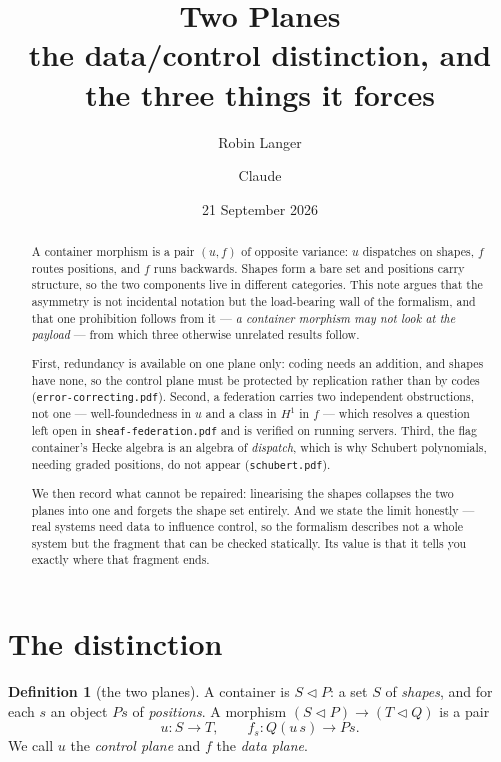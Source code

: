 \documentclass[11pt,a4paper]{article}
\title{\bfseries Two Planes\\[0.4em]
\large the data/control distinction, and the three things it forces}
\author{Robin Langer \and Claude}
\date{21 September 2026}
\theoremstyle{definition}
\newtheorem{definition}[theorem]{Definition}
\theoremstyle{remark}
\newcommand{\con}{\triangleleft}
\begin{document}
\maketitle

\begin{abstract}
A container morphism is a pair $(u, f)$ of opposite variance: $u$ dispatches on
shapes, $f$ routes positions, and $f$ runs backwards. Shapes form a bare set and
positions carry structure, so the two components live in different categories.
This note argues that the asymmetry is not incidental notation but the load-bearing
wall of the formalism, and that one prohibition follows from it --- \emph{a
container morphism may not look at the payload} --- from which three otherwise
unrelated results follow.

First, redundancy is available on one plane only: coding needs an addition, and
shapes have none, so the control plane must be protected by replication rather
than by codes (\texttt{error-correcting.pdf}). Second, a federation carries two
independent obstructions, not one --- well-foundedness in $u$ and a class in
$H^1$ in $f$ --- which resolves a question left open in
\texttt{sheaf-federation.pdf} and is verified on running servers. Third, the
flag container's Hecke algebra is an algebra of \emph{dispatch}, which is why
Schubert polynomials, needing graded positions, do not appear
(\texttt{schubert.pdf}).

We then record what cannot be repaired: linearising the shapes collapses the two
planes into one and forgets the shape set entirely. And we state the limit
honestly --- real systems need data to influence control, so the formalism
describes not a whole system but the fragment that can be checked statically. Its
value is that it tells you exactly where that fragment ends.
\end{abstract}

\section{The distinction}

\begin{definition}[the two planes]
A container is $S \con P$: a set $S$ of \emph{shapes}, and for each $s$ an object
$P s$ of \emph{positions}. A morphism $(S \con P) \to (T \con Q)$ is a pair
\[
  u : S \longrightarrow T,
  \qquad
  f_s : Q(u\,s) \longrightarrow P s .
\]
We call $u$ the \emph{control plane} and $f$ the \emph{data plane}.
\end{definition}
\end{document}
